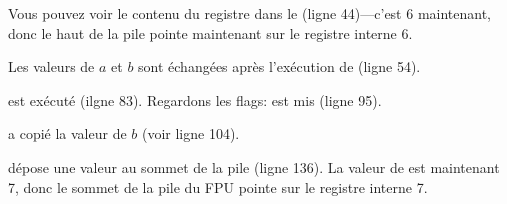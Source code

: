 Vous pouvez voir le contenu du registre  dans le  (ligne 44)---c'est
6 maintenant, donc le haut de la pile pointe maintenant sur le registre interne 6.

Les valeurs de $a$ et $b$ sont échangées après l'exécution de  (ligne 54).

 est exécuté (ilgne 83).
Regardons les flags: \CF est mis (ligne 95).

 a copié la valeur de $b$ (voir ligne 104).

\FSTP dépose une valeur au sommet de la pile (ligne 136).
La valeur de  est maintenant 7, donc le sommet de la pile du FPU pointe
sur le registre interne 7.

